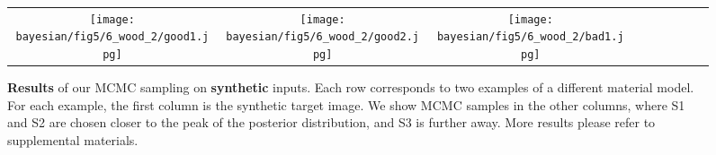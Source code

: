 \begin{figure}[h!]
\begin{tabular}{ccccccccc}
		\texttt{[image: bayesian/fig5/6\_wood\_2/good1.jpg]} &
		\texttt{[image: bayesian/fig5/6\_wood\_2/good2.jpg]} &
		\texttt{[image: bayesian/fig5/6\_wood\_2/bad1.jpg]}
	\end{tabular}
	\caption[Synthetic results]{\label{fig:bayesian:synthetic}
		\textbf{Results} of our MCMC sampling on \textbf{synthetic} inputs. Each row corresponds to two examples of a different material model. For each example, the first column is the synthetic target image. We show MCMC samples in the other columns, where S1 and S2 are chosen closer to the peak of the posterior distribution, and S3 is further away. More results please refer to supplemental materials.
	}
\end{figure}
